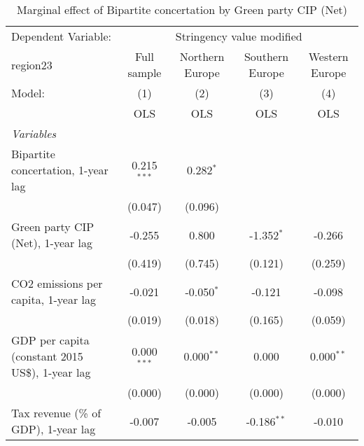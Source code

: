 
\begin{table}[htbp]
   \caption{Marginal effect of Bipartite concertation by Green party CIP (Net)}
   \centering
   \begin{tabular}{lcccc}
      \toprule
      Dependent Variable: & \multicolumn{4}{c}{Stringency value modified}\\
      region23                                                               & Full sample   & Northern Europe & Southern Europe & Western Europe \\   
      Model:                                                                 & (1)           & (2)             & (3)             & (4)\\  
                                                                             &  OLS          & OLS             & OLS             & OLS\\  
      \midrule
      \emph{Variables}\\
      Bipartite concertation, 1-year lag                                     & 0.215$^{***}$ & 0.282$^{*}$     &                 &   \\   
                                                                             & (0.047)       & (0.096)         &                 &   \\   
      Green party CIP (Net), 1-year lag                                      & -0.255        & 0.800           & -1.352$^{*}$    & -0.266\\   
                                                                             & (0.419)       & (0.745)         & (0.121)         & (0.259)\\   
      CO2 emissions per capita, 1-year lag                                   & -0.021        & -0.050$^{*}$    & -0.121          & -0.098\\   
                                                                             & (0.019)       & (0.018)         & (0.165)         & (0.059)\\   
      GDP per capita (constant 2015 US\$), 1-year lag                        & 0.000$^{***}$ & 0.000$^{**}$    & 0.000           & 0.000$^{**}$\\   
                                                                             & (0.000)       & (0.000)         & (0.000)         & (0.000)\\   
      Tax revenue (\% of GDP), 1-year lag                                    & -0.007        & -0.005          & -0.186$^{**}$   & -0.010\\   

\end{tabular}
\end{table}

